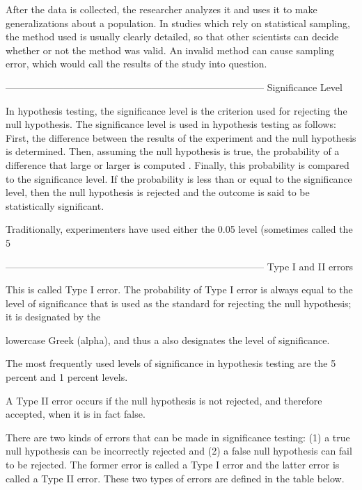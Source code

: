 After the data is collected, the researcher analyzes it and uses it to make generalizations about a population. In studies which rely on statistical sampling, the method used is usually clearly detailed, so that other scientists can decide whether or not the method was valid. An invalid method can cause sampling error, which would call the results of the study into question.


--------------------------------------------------------------------------------
Significance Level

In hypothesis testing, the significance level is the criterion used for rejecting the null hypothesis. The significance level is used in hypothesis testing as follows: First, the difference between the results of the experiment and the null hypothesis is determined. Then, assuming the null hypothesis is true, the probability of a difference that large or larger is computed . Finally, this probability is compared to the significance level. If the probability is less than or equal to the significance level, then the null hypothesis is rejected and the outcome is said to be statistically significant. 


Traditionally, experimenters have used either the 0.05 level (sometimes called the 5%



--------------------------------------------------------------------------------
Type I and II errors

This is called Type I error. The probability of Type I error is always equal to the level of significance that is used as the standard for rejecting the null hypothesis; it is designated by the

lowercase Greek (alpha), and thus a also designates the level of significance. 


The most frequently used levels of significance in hypothesis testing are the 5 percent and 1 percent levels.


A Type II error occurs if the null hypothesis is not rejected, and therefore accepted, when it is in fact false.


There are two kinds of errors that can be made in significance testing: (1) a true null hypothesis can be incorrectly rejected and (2) a false null hypothesis can fail to be rejected. The former error is called a Type I error and the latter error is called a Type II error. These two types of errors are defined in the table below. 













